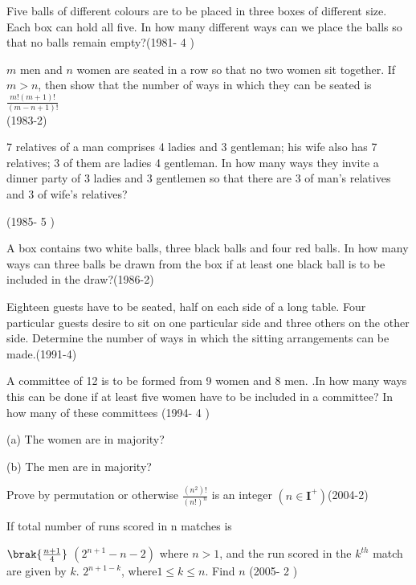\iffalse
  \title{Permutations And Combinations}
  \author{BALAJI B}
  \section{subjective}
\fi

    \item   Five balls of different colours are to be placed in three boxes of different size. Each box can hold all five. In how many different ways can we place the balls so that no balls remain empty?\hfill (1981- 4 )
    
    \item $m$ men and $n$ women are seated in a row so that no two women sit together. If $m>n$, then show that the number of ways in which they can be seated is $\frac{m!(m+1)!}{(m-n+1)!}$ \\

    \hfill (1983-2)
    \item 7 relatives of a man comprises 4 ladies and 3 gentleman; his wife also has 7 relatives; 3 of them are ladies 4 gentleman. In how many ways they invite a dinner party of 3 ladies and 3 gentlemen so that there are 3 of man's relatives and 3 of wife's relatives?
    
    \hfill (1985- 5 )
    \item A box contains two white balls, three black balls and four red balls. In how many ways can three balls be drawn from the box if at least one black ball is to be included in the draw?\hfill (1986-2)
    
    \item Eighteen guests have to be seated, half on each side of a long table. Four particular guests desire to sit on one particular side and three others on the other side. Determine the number of ways in which the sitting arrangements can be made.\hfill (1991-4)
    \item A committee of 12 is to be formed from 9 women and 8 men. .In how many ways this can be done if at least five women have to be included in a committee? In how many of these committees \hfill (1994- 4 )

    (a)  The women are in majority?

    (b)  The men are in majority?
    
    \item Prove by permutation or otherwise $\frac{(n^2)!}{(n!)^n}$ is an integer $(n\in \mathbf{I}^+) $\hfill (2004-2)
     \item If total number of runs scored in n matches is
     
     $\brak{\frac{n+1}{4}}$  $(2^{n+1}-n-2)$ where $n>1$, and the run scored in the $k^{th}$ match are given by $k$. $2^{n+1-k}$, where$ 1 \leq k \leq n$. Find $n$ \hfill (2005- 2 )
     



